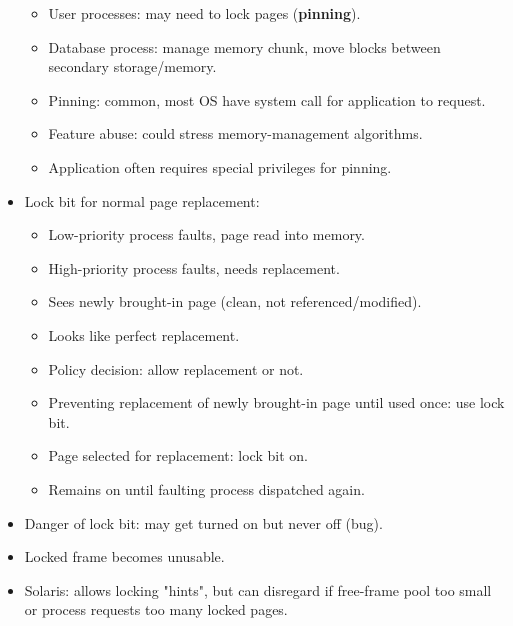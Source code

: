 \begin{itemize}
\begin{itemize}
        \item User processes: may need to lock pages (\textbf{pinning}).
        \item Database process: manage memory chunk, move blocks between secondary storage/memory.
        \item Pinning: common, most OS have system call for application to request.
        \item Feature abuse: could stress memory-management algorithms.
        \item Application often requires special privileges for pinning.
    \end{itemize}
    \item Lock bit for normal page replacement:
    \begin{itemize}
        \item Low-priority process faults, page read into memory.
        \item High-priority process faults, needs replacement.
        \item Sees newly brought-in page (clean, not referenced/modified).
        \item Looks like perfect replacement.
        \item Policy decision: allow replacement or not.
        \item Preventing replacement of newly brought-in page until used once: use lock bit.
        \item Page selected for replacement: lock bit on.
        \item Remains on until faulting process dispatched again.
    \end{itemize}
    \item Danger of lock bit: may get turned on but never off (bug).
    \item Locked frame becomes unusable.
    \item Solaris: allows locking "hints", but can disregard if free-frame pool too small or process requests too many locked pages.
\end{itemize}

